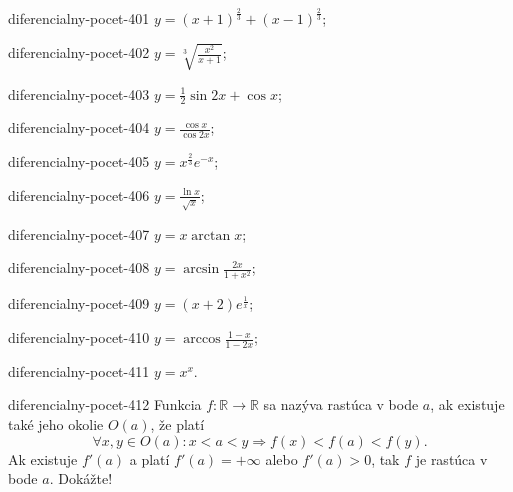 \begin{defproblem}{diferencialny-pocet-401}
$y=(x+1)^{\frac{2}{3}}+(x-1)^{\frac{2}{3}}$;
\end{defproblem}

\begin{defproblem}{diferencialny-pocet-402}
$y=\sqrt[3]{\frac{x^2}{x+1}}$;
\end{defproblem}

\begin{defproblem}{diferencialny-pocet-403}
$y=\frac{1}{2}\sin 2x +\cos x$;
\end{defproblem}

\begin{defproblem}{diferencialny-pocet-404}
$y=\frac{\cos x}{\cos 2x}$;
\end{defproblem}

\begin{defproblem}{diferencialny-pocet-405}
$y=x^{\frac{2}{3}}e^{-x}$;
\end{defproblem}

\begin{defproblem}{diferencialny-pocet-406}
$y=\frac{\ln x}{\sqrt{x}}$;
\end{defproblem}

\begin{defproblem}{diferencialny-pocet-407}
$y=x\arctan x$;
\end{defproblem}

\begin{defproblem}{diferencialny-pocet-408}
$y=\arcsin \frac{2x}{1+x^2}$;
\end{defproblem}

\begin{defproblem}{diferencialny-pocet-409}
$y=(x+2)e^{\frac{1}{x}}$;
\end{defproblem}

\begin{defproblem}{diferencialny-pocet-410}
$y=\arccos \frac{1-x}{1-2x}$;
\end{defproblem}

\begin{defproblem}{diferencialny-pocet-411}
$y=x^x$.
\end{defproblem}

\begin{defproblem}{diferencialny-pocet-412}
Funkcia $f:\mathbb{R}\rightarrow\mathbb{R}$ sa nazýva rastúca v bode $a$, ak existuje také jeho okolie $O(a)$, že platí
$$\forall x,y\in O(a):x<a<y\Rightarrow f(x)<f(a)<f(y).$$
Ak existuje $f'(a)$ a platí $f'(a)=+\infty$ alebo $f'(a)>0$, tak $f$ je rastúca v bode $a$. Dokážte!
\end{defproblem}

